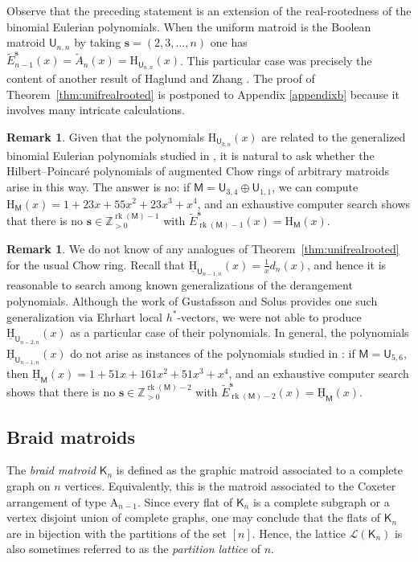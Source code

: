 \documentclass[11pt, a4paper, english]{amsart}
\theoremstyle{teoremas}
\theoremstyle{definition}
\newtheorem{remark}[theorem]{Remark}
\DeclareMathOperator{\rk}{rk}
\newcommand{\M}{\mathsf{M}}
\newcommand{\U}{\mathsf{U}}
\newcommand{\Z}{\mathbb{Z}}
\renewcommand{\H}{\mathrm{H}}
\newcommand{\uH}{\underline{\mathrm{H}}}
\begin{document}
Observe that the preceding statement is an extension of the real-rootedness of the binomial Eulerian polynomials. When the uniform matroid is the Boolean matroid $\U_{n,n}$ by taking $\mathbf{s}=(2,3,\ldots,n)$ one has $\widetilde{E}^{\mathbf{s}}_{n-1}(x) = \widetilde{A}_n(x) = \H_{\U_{n,n}}(x)$. This particular case was precisely the content of another result of Haglund and Zhang \cite[Theorem~3.1]{haglund-zhang}. The proof of Theorem~\ref{thm:unifrealrooted} is postponed to Appendix \ref{appendixb} because it involves many intricate calculations. 


\begin{remark}
   Given that the polynomials $\H_{\U_{k, n}}(x)$ are related to 
   the generalized binomial Eulerian polynomials
   studied in \cite{haglund-zhang}, it is natural to ask whether the Hilbert--Poincar\'e polynomials
   of augmented Chow rings of arbitrary matroids arise in this way. The answer is no: if $\M=\U_{3, 4} \oplus \U_{1, 1}$, we can compute $\H_\M(x) = 1 + 23x + 55x^2 + 23x^3 + x^4$, and an exhaustive computer
   search shows that there is no $\mathbf{s} \in \Z_{>0}^{\rk(\M) - 1}$ with $\widetilde{E}^{\mathbf s}_{\rk(\M) - 1}(x) = \H_{\M}(x)$.
\end{remark}

\begin{remark}
   We do not know of any analogues of Theorem~\ref{thm:unifrealrooted} for the usual Chow ring. Recall that $\uH_{\U_{n-1,n}}(x) = \frac{1}{x} d_n(x)$, and hence it is reasonable to search among known generalizations of the derangement polynomials. Although the work of Gustafsson and Solus \cite{gustafsson-solus} provides one such generalization via Ehrhart local $h^*$-vectors, we were not able to produce $\uH_{\U_{n-2,n}}(x)$ as a particular case of their polynomials.
   In general, the polynomials $\uH_{\U_{n-1,n}}(x)$ do not arise as instances of the polynomials
   studied in \cite{haglund-zhang}: if $\M = \U_{5,6}$, then $\uH_{\M}(x) = 1 + 51x + 161x^2 + 51x^3 + x^4$, and
   an exhaustive computer search shows that there is no $\mathbf{s} \in \Z_{>0}^{\rk(\M) - 2}$ with $\widetilde{E}^{\mathbf s}_{\rk(\M) - 2}(x) = \uH_{\M}(x)$.
\end{remark}


\subsection{Braid matroids}

The \emph{braid matroid} $\mathsf{K}_n$ is defined as the graphic matroid associated to a complete graph on $n$ vertices. Equivalently, this is the matroid associated to the Coxeter arrangement of type $\mathrm{A}_{n-1}$. Since every flat of $\mathsf{K}_n$ is a complete subgraph or a vertex disjoint union of complete graphs, one may conclude that the flats of $\mathsf{K}_n$ are in bijection with the partitions of the set $[n]$. Hence, the lattice $\mathcal{L}(\mathsf{K}_n)$ is also sometimes referred to as the \emph{partition lattice} of $n$.
\end{document}
